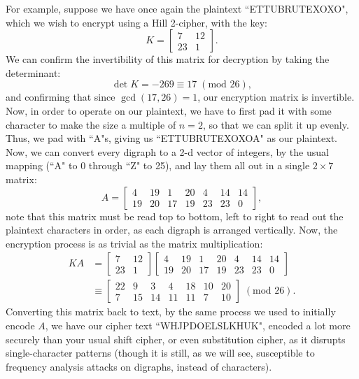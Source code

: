 \documentclass{article}
\begin{document}
\noindent For example, suppose we have once again the plaintext ``ETTUBRUTEXOXO", which we wish to encrypt using a Hill 2-cipher, with the key:
\[
    K = \begin{bmatrix}
        7 & 12 \\
        23 & 1
    \end{bmatrix}.
\]
We can confirm the invertibility of this matrix for decryption by taking the determinant:
\[
    \det K = -269 \equiv 17 \; (\text{mod } 26),
\]
and confirming that since $\gcd (17, 26) = 1$, our encryption matrix is invertible. Now, in order to operate on our plaintext, we have to first pad it with some character to make the size a multiple of $n = 2$, so that we can split it up evenly. Thus, we pad with ``A"s, giving us ``ETTUBRUTEXOXOA" as our plaintext. Now, we can convert every digraph to a 2-d vector of integers, by the usual mapping (``A" to 0 through ``Z" to 25), and lay them all out in a single $2 \times 7$ matrix:
\[
    A = \begin{bmatrix}
        4 & 19 & 1 & 20 & 4 & 14 & 14 \\
        19 & 20 & 17 & 19 & 23 & 23 & 0
    \end{bmatrix},
\]
note that this matrix must be read top to bottom, left to right to read out the plaintext characters in order, as each digraph is arranged vertically. Now, the encryption process is as trivial as the matrix multiplication:
\begin{align*}
    K A &= \begin{bmatrix}
        7 & 12 \\
        23 & 1
    \end{bmatrix} \begin{bmatrix}
        4 & 19 & 1 & 20 & 4 & 14 & 14 \\
        19 & 20 & 17 & 19 & 23 & 23 & 0
    \end{bmatrix} \\
    &\equiv \begin{bmatrix}
        22 & 9 & 3 & 4 & 18 & 10 & 20 \\
        7 & 15 & 14 & 11 & 11 & 7 & 10
    \end{bmatrix} \; (\text{mod } 26).
\end{align*}
Converting this matrix back to text, by the same process we used to initially encode $A$, we have our cipher text ``WHJPDOELSLKHUK", encoded a lot more securely than your usual shift cipher, or even substitution cipher, as it disrupts single-character patterns (though it is still, as we will see, susceptible to frequency analysis attacks on digraphs, instead of characters).
\end{document}
